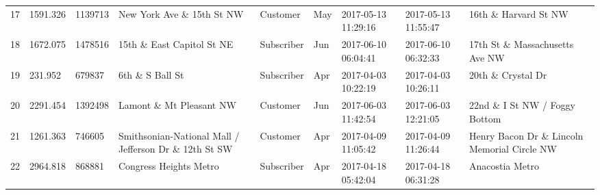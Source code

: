 \documentclass[11pt]{article}
\begin{document}
\begin{tabular}{r|llllllll}
	17 & 1591.326                                                & 1139713                                                 & New York Ave \& 15th St NW                             & Customer                                                & May                                                     & 2017-05-13 11:29:16                                     & 2017-05-13 11:55:47                                     & 16th \& Harvard St NW                                 \\
	18 & 1672.075                                                & 1478516                                                 & 15th \& East Capitol St NE                             & Subscriber                                              & Jun                                                     & 2017-06-10 06:04:41                                     & 2017-06-10 06:32:33                                     & 17th St \& Massachusetts Ave NW                       \\
	19 &  231.952                                                &  679837                                                 & 6th \& S Ball St                                       & Subscriber                                              & Apr                                                     & 2017-04-03 10:22:19                                     & 2017-04-03 10:26:11                                     & 20th \& Crystal Dr                                    \\
	20 & 2291.454                                                & 1392498                                                 & Lamont \& Mt Pleasant NW                               & Customer                                                & Jun                                                     & 2017-06-03 11:42:54                                     & 2017-06-03 12:21:05                                     & 22nd \& I St NW / Foggy Bottom                        \\
	21 & 1261.363                                                &  746605                                                 & Smithsonian-National Mall / Jefferson Dr \& 12th St SW & Customer                                                & Apr                                                     & 2017-04-09 11:05:42                                     & 2017-04-09 11:26:44                                     & Henry Bacon Dr \& Lincoln Memorial Circle NW          \\
	22 & 2964.818                                              &  868881                                               & Congress Heights Metro                                & Subscriber                                            & Apr                                                   & 2017-04-18 05:42:04                                   & 2017-04-18 06:31:28                                   & Anacostia Metro                                      \\

\end{tabular}
\end{document}
